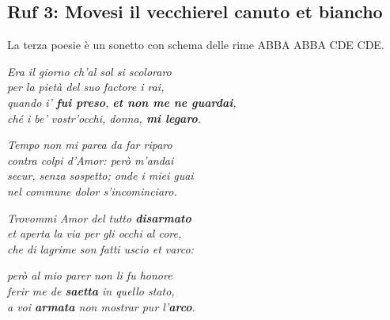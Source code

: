 \documentclass[a4paper]{article}
\begin{document}
\subsection{Ruf 3: Movesi il vecchierel canuto et biancho}

La terza poesie è un sonetto con schema delle rime ABBA ABBA CDE CDE.

\begin{center}
    \textit{Era il giorno ch'al sol si scoloraro} \\
    \textit{per la pietà del suo factore i rai,} \\
    \textit{quando i' \textbf{fui preso}, \textbf{et non me ne guardai},} \\
    \textit{ché i be' vostr'occhi, donna, \textbf{mi legaro}.}
\end{center}
\begin{center}
    \textit{Tempo non mi parea da far riparo} \\
    \textit{contra colpi d'Amor: però m'andai} \\
    \textit{secur, senza sospetto; onde i miei guai} \\
    \textit{nel commune dolor s'incominciaro.}
\end{center}
\begin{center}
    \textit{Trovommi Amor del tutto \textbf{disarmato}} \\
    \textit{et aperta la via per gli occhi al core,} \\
    \textit{che di lagrime son fatti uscio et varco:}
\end{center}
\begin{center}
    \textit{però al mio parer non li fu honore} \\
    \textit{ferir me de \textbf{saetta} in quello stato,} \\
    \textit{a voi \textbf{armata} non mostrar pur l'\textbf{arco}.}
\end{center}
\end{document}
